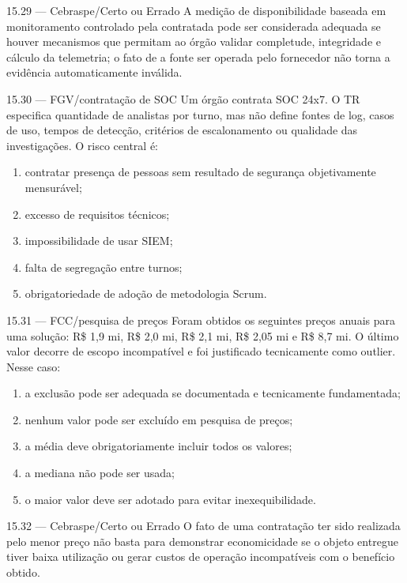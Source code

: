 \begin{questao}{ 15.29 — Cebraspe/Certo ou Errado}
A medição de disponibilidade baseada em monitoramento controlado pela contratada pode ser considerada adequada se houver mecanismos que permitam ao órgão validar completude, integridade e cálculo da telemetria; o fato de a fonte ser operada pelo fornecedor não torna a evidência automaticamente inválida.
\end{questao}

\begin{questao}{ 15.30 — FGV/contratação de SOC}
Um órgão contrata SOC 24x7. O TR especifica quantidade de analistas por turno, mas não define fontes de log, casos de uso, tempos de detecção, critérios de escalonamento ou qualidade das investigações. O risco central é:
\begin{enumerate}[label=\Alph*)]
\item contratar presença de pessoas sem resultado de segurança objetivamente mensurável;
\item excesso de requisitos técnicos;
\item impossibilidade de usar SIEM;
\item falta de segregação entre turnos;
\item obrigatoriedade de adoção de metodologia Scrum.
\end{enumerate}
\end{questao}

\begin{questao}{ 15.31 — FCC/pesquisa de preços}
Foram obtidos os seguintes preços anuais para uma solução: R\$ 1,9 mi, R\$ 2,0 mi, R\$ 2,1 mi, R\$ 2,05 mi e R\$ 8,7 mi. O último valor decorre de escopo incompatível e foi justificado tecnicamente como outlier. Nesse caso:
\begin{enumerate}[label=\Alph*)]
\item a exclusão pode ser adequada se documentada e tecnicamente fundamentada;
\item nenhum valor pode ser excluído em pesquisa de preços;
\item a média deve obrigatoriamente incluir todos os valores;
\item a mediana não pode ser usada;
\item o maior valor deve ser adotado para evitar inexequibilidade.
\end{enumerate}
\end{questao}

\begin{questao}{ 15.32 — Cebraspe/Certo ou Errado}
O fato de uma contratação ter sido realizada pelo menor preço não basta para demonstrar economicidade se o objeto entregue tiver baixa utilização ou gerar custos de operação incompatíveis com o benefício obtido.
\end{questao}


